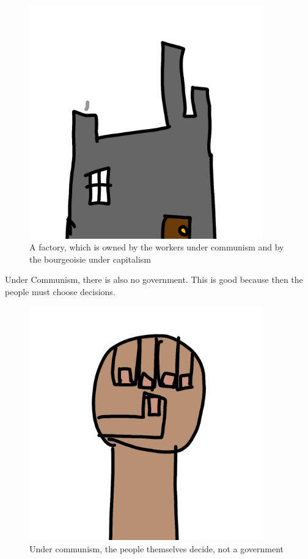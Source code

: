\documentclass[a4paper]{book} %
\begin{document}
\begin{figure}[tbhp]
\centering
\includegraphics[width=0.9\textwidth]{2-3.png}
\caption{A factory, which is owned by the workers under communism and by the bourgeoisie under capitalism}
\end{figure}

  Under Communism, there is also no government. This is good because then the people must choose decisions.

\begin{figure}[tbhp]
\centering
\includegraphics[width=0.9\textwidth]{2-2.png}
\caption{Under communism, the people themselves decide, not a government}
\end{figure}
\end{document}
